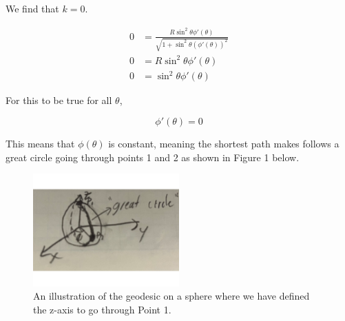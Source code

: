 \documentclass{article}
\begin{document}
    We find that $k=0$. 

    \begin{align*}
        0 &= \frac{R\sin^2{\theta}\phi'(\theta)}{\sqrt{1 + \sin^2{\theta}(\phi'(\theta))^2}}\\
        0 &= R\sin^2{\theta}\phi'(\theta) \\
        0 &= \sin^2{\theta}\phi'(\theta)
    \end{align*}

    For this to be true for all $\theta$,

    $$\phi'(\theta)=0$$

    This means that $\phi(\theta)$ is constant, meaning the shortest path makes follows a great circle going through points 1 and 2 as shown in Figure 1 below. 
    \begin{figure}[!b]
        \centering
        \includegraphics[width=0.5\textwidth]{HW_1_Fig_1.pdf}
        \caption{An illustration of the geodesic on a sphere where we have defined the z-axis to go through Point 1.}
    \end{figure}
    
  
\end{document}
